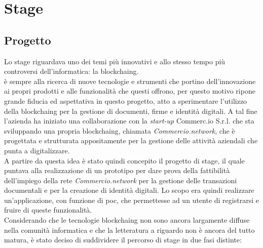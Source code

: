 
\chapter{Stage}
\label{cap:stage}

\section{Progetto}

Lo stage riguardava uno dei temi più innovativi e allo stesso tempo più controversi dell'informatica: la \gls{blockchaing}.\\
\myCompany{} \companyTitle{} è sempre alla ricerca di nuove tecnologie e strumenti che portino dell'innovazione ai propri prodotti e alle funzionalità che questi offrono, per questo motivo ripone grande fiducia ed aspettativa in questo progetto, atto a sperimentare l'utilizzo della \gls{blockchaing} per la gestione di documenti, firme e identità digitali.
A tal fine l'azienda ha iniziato una collaborazione con la \textit{start-up} Commerc.io S.r.l. che sta sviluppando una propria \gls{blockchaing}, chiamata \textit{Commercio.network}, che è progettata e strutturata appositamente per la gestione delle attività aziendali che \myCompany{} \companyTitle{} punta a digitalizzare.\\
A partire da questa idea è stato quindi concepito il progetto di stage, il quale puntava alla realizzazione di un prototipo per dare prova della fattibilità dell'impiego della rete \textit{Commercio.network} per la gestione delle transazioni documentali e per la creazione di identità digitali. Lo scopo era quindi realizzare un'applicazione, con funzione di \gls{poc}, che permettesse ad un utente di registrarsi e fruire di queste funzionalità.\\
Considerando che le tecnologie \gls{blockchaing} non sono ancora largamente diffuse nella comunità informatica e che la letteratura a riguardo non è ancora del tutto matura, è stato deciso di suddividere il percorso di stage in due fasi distinte:

